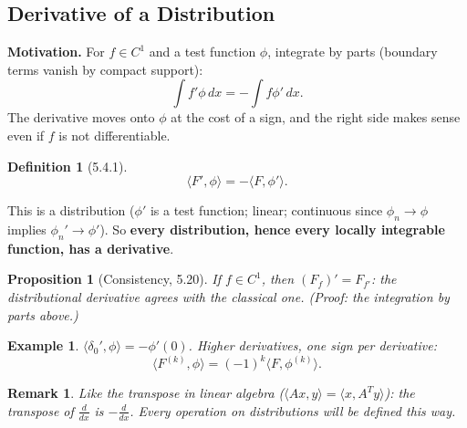 \documentclass{article}
\newtheorem{definition}{Definition}
\newtheorem*{example}{Example}
\newtheorem{remark}{Remark}
\newtheorem{proposition}{Proposition}
\newcommand{\ip}[2]{\langle #1, #2 \rangle}
\begin{document}
\subsection{Derivative of a Distribution}
\textbf{Motivation.} For $f \in C^1$ and a test function $\phi$, integrate by parts (boundary terms vanish by compact support):
\begin{equation}
    \int f'\phi\,dx = -\int f\phi'\,dx.
\end{equation}
The derivative moves onto $\phi$ at the cost of a sign, and the right side makes sense even if $f$ is not differentiable.
\begin{definition}[5.4.1]
    \begin{equation}
        \ip{F'}{\phi} = -\ip{F}{\phi'}.
    \end{equation}
\end{definition}
This is a distribution ($\phi'$ is a test function; linear; continuous since $\phi_n \to \phi$ implies $\phi_n' \to \phi'$). So \textbf{every distribution, hence every locally integrable function, has a derivative}.
\begin{proposition}[Consistency, 5.20]
    If $f \in C^1$, then $(F_f)' = F_{f'}$: the distributional derivative agrees with the classical one. (Proof: the integration by parts above.)
\end{proposition}
\begin{example}
    $\ip{\delta_0'}{\phi} = -\phi'(0)$. Higher derivatives, one sign per derivative:
    \begin{equation}
        \ip{F^{(k)}}{\phi} = (-1)^k \ip{F}{\phi^{(k)}}.
    \end{equation}
\end{example}
\begin{remark}
    Like the transpose in linear algebra ($\langle Ax, y\rangle = \langle x, A^T y\rangle$): the transpose of $\frac{d}{dx}$ is $-\frac{d}{dx}$. Every operation on distributions will be defined this way.
\end{remark}
\end{document}
